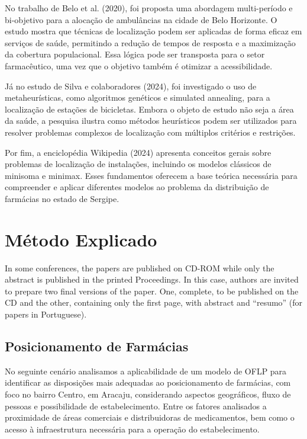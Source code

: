 \documentclass[12pt]{article}
\begin{document}
No trabalho de Belo et al. (2020), foi proposta uma abordagem multi-período e bi-objetivo para a alocação de ambulâncias na cidade de Belo Horizonte. O estudo mostra que técnicas de localização podem ser aplicadas de forma eficaz em serviços de saúde, permitindo a redução de tempos de resposta e a maximização da cobertura populacional. Essa lógica pode ser transposta para o setor farmacêutico, uma vez que o objetivo também é otimizar a acessibilidade.

Já no estudo de Silva e colaboradores (2024), foi investigado o uso de metaheurísticas, como algoritmos genéticos e simulated annealing, para a localização de estações de bicicletas. Embora o objeto de estudo não seja a área da saúde, a pesquisa ilustra como métodos heurísticos podem ser utilizados para resolver problemas complexos de localização com múltiplos critérios e restrições.

Por fim, a enciclopédia Wikipedia (2024) apresenta conceitos gerais sobre problemas de localização de instalações, incluindo os modelos clássicos de minisoma e minimax. Esses fundamentos oferecem a base teórica necessária para compreender e aplicar diferentes modelos ao problema da distribuição de farmácias no estado de Sergipe.

\section{Método Explicado}

In some conferences, the papers are published on CD-ROM while only the
abstract is published in the printed Proceedings. In this case, authors are
invited to prepare two final versions of the paper. One, complete, to be
published on the CD and the other, containing only the first page, with
abstract and ``resumo'' (for papers in Portuguese).

\subsection{Posicionamento de Farmácias}

No seguinte cenário analisamos a aplicabilidade de um modelo de OFLP para identificar as disposições mais adequadas ao posicionamento de farmácias, com foco no bairro Centro, em Aracaju, considerando aspectos geográficos, fluxo de pessoas e possibilidade de estabelecimento. Entre os fatores analisados a proximidade de áreas comerciais e distribuidoras de medicamentos, bem como o acesso à infraestrutura necessária para a operação do estabelecimento.
\end{document}
